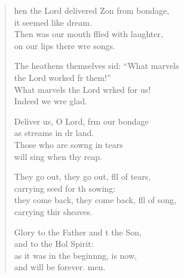 \settowidth{\versewidth}{they come back, they come back, full of song, *}
\begin{verse}%
  \begin{patverse}
hen the Lord delivered Z\pointup{\i}on from bondage,\Med\\
it seemed like  dream.\\
Then was our mouth f\pointup{\i}lled with laughter,\Med\\
on our lips there wre songs.

The heathens themselves sid: “What marvels\Med\\
the Lord worked fr them!”\\
What marvels the Lord wrked for us!\Med\\
Indeed we wre glad.

Deliver us, O Lord, frm our bondage\Med\\
as streams in dr land.\\
Those who are sow\pointup{\i}ng in tears\Med\\
will sing when thy reap.

They go out, they go out, fll of tears,\Med\\
carrying seed for th sowing:\\
they come back, they come back, fll of song,\Med\\
carrying thir sheaves.

Glory to the Father and t the Son,\Med\\
and to the Hol Spirit:\\
as it was in the beginn\pointup{\i}ng, is now,\Med\\
and will be forever. men. 
  \end{patverse}
\end{verse}
